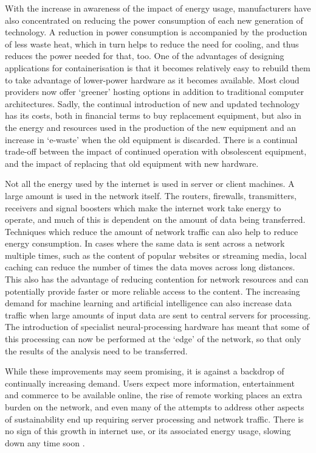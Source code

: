 With the increase in awareness of the impact of energy usage, manufacturers have also concentrated on reducing the power consumption of each new generation of technology. A reduction in power consumption is accompanied by the production of less waste heat, which in turn helps to reduce the need for cooling, and thus reduces the power needed for that, too. One of the advantages of designing applications for containerisation is that it becomes relatively easy to rebuild them to take advantage of lower-power hardware as it becomes available. Most cloud providers now offer `greener' hosting options in addition to traditional computer architectures. Sadly, the continual introduction of new and updated technology has its costs, both in financial terms to buy replacement equipment, but also in the energy and resources used in the production of the new equipment and an increase in `e-waste' when the old equipment is discarded. There is a continual trade-off between the impact of continued operation with obsolescent equipment, and the impact of replacing that old equipment with new hardware.

Not all the energy used by the internet is used in server or client machines. A large amount is used in the network itself. The routers, firewalls, transmitters, receivers and signal boosters which make the internet work take energy to operate, and much of this is dependent on the amount of data being transferred. Techniques which reduce the amount of network traffic can also help to reduce energy consumption. In cases where the same data is sent across a network multiple times, such as the content of popular websites or streaming media, local caching can reduce the number of times the data moves across long distances. This also has the advantage of reducing contention for network resources and can potentially provide faster or more reliable access to the content. The increasing demand for machine learning and artificial intelligence can also increase data traffic when large amounts of input data are sent to central servers for processing. The introduction of specialist neural-processing hardware has meant that some of this processing can now be performed at the `edge' of the network, so that only the results of the analysis need to be transferred. 

While these improvements may seem promising, it is against a backdrop of continually increasing demand. Users expect more information, entertainment and commerce to be available online, the rise of remote working places an extra burden on the network, and even many of the attempts to address other aspects of sustainability end up requiring server processing and network traffic. There is no sign of this growth in internet use, or its associated energy usage, slowing down any time soon \citep{Morley2018} \citep{Odlyzko2016}.

